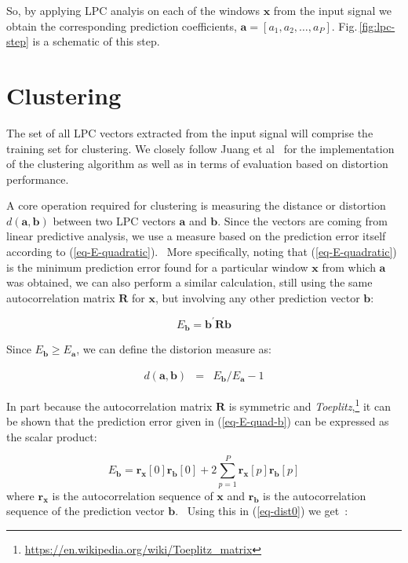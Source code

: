 \documentclass[letterpaper,12pt]{article}
\newcommand{\ba}{\ensuremath{\mathbf{a}}}
\newcommand{\bb}{\ensuremath{\mathbf{b}}}
\newcommand{\bx}{\ensuremath{\mathbf{x}}}
\newcommand{\br}{\ensuremath{\mathbf{r}}}
\newcommand{\bR}{\ensuremath{\mathbf{R}}}
\begin{document}
    So, by applying LPC analyis on each of the windows $\bx$ from the
    input signal we obtain the corresponding prediction coefficients,
    $\ba = [ a_1, a_2, \ldots, a_P ]$.
	Fig.\,\ref{fig:lpc-step} is a schematic of this step.

    \section{Clustering}\label{sec:clustering}

    The set of all LPC vectors extracted from the input signal
    will comprise the training set for clustering.
    We closely follow Juang et al~\citep{Juang-etal:82}
    for the implementation of the clustering algorithm as well as in terms of
    evaluation based on distortion performance.

    A core operation required for clustering is measuring the distance or
    distortion $d(\ba,\bb)$ between two LPC vectors $\ba$ and $\bb$.
    Since the vectors are coming from linear predictive analysis,
    we use a measure based on the prediction error itself according
    to (\ref{eq-E-quadratic}).
    \
    More specifically, noting that (\ref{eq-E-quadratic}) is the minimum prediction error
    found for a particular window $\bx$ from which $\ba$ was obtained, we can also
    perform a similar calculation, still using the same autocorrelation matrix $\bR$
    for $\bx$, but involving any other prediction vector $\bb$:

    \begin{equation}
        E_\bb = \bb^\prime \bR \bb   \label{eq-E-quad-b}
    \end{equation}

    Since $E_\bb \ge E_\ba$, we can define the distorion measure as:

    \begin{equation}
        \begin{array}{rcl}
            d(\ba,\bb) &=& E_\bb / E_\ba - 1  \label{eq-dist0}
        \end{array}
    \end{equation}

    In part because the autocorrelation matrix $\bR$ is symmetric and \textit{Toeplitz},\footnote{
        \url{https://en.wikipedia.org/wiki/Toeplitz_matrix}
    }
    it can be shown that the prediction error given in (\ref{eq-E-quad-b})
    can be expressed as the scalar product:

    \begin{equation}
        E_\bb = \br_\bx[0] \br_\bb[0] + 2 \sum_{p = 1}^P \br_\bx[p] \br_\bb[p] \label{eq-Eb}
    \end{equation}
    where
    $\br_\bx$ is the autocorrelation sequence of $\bx$
    and
    $\br_\bb$ is the autocorrelation sequence of the prediction vector $\bb$.
    \
    Using this in (\ref{eq-dist0}) we get~\citep{Juang-etal:82}:
\end{document}
